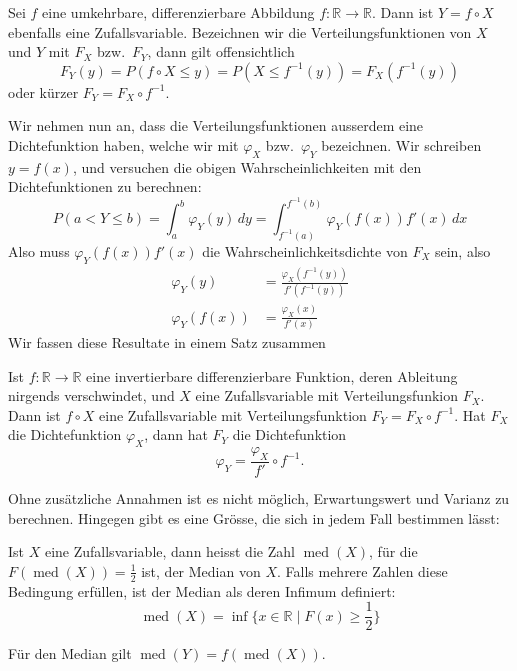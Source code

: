 Sei $f$ eine umkehrbare, differenzierbare Abbildung
$f\colon\mathbb{R}\to\mathbb{R}$.
Dann ist $Y=f\circ X$ ebenfalls eine
Zufallsvariable.
Bezeichnen wir die Verteilungsfunktionen von $X$ und $Y$
mit $F_X$ bzw.~$F_Y$, dann gilt offensichtlich
\[
F_Y(y)=P(f\circ X\le y)=P(X\le f^{-1}(y))=F_X(f^{-1}(y))
\]
oder kürzer $F_Y=F_X\circ f^{-1}$.

Wir nehmen nun an, dass die Verteilungsfunktionen ausserdem eine
Dichtefunktion haben, welche wir mit $\varphi_X$ bzw.~$\varphi_Y$
bezeichnen.
Wir schreiben $y=f(x)$, und versuchen die obigen
Wahrscheinlichkeiten mit den Dichtefunktionen zu berechnen:
\[
P(a<Y\le b)
=\int_a^b\varphi_Y(y)\,dy
=\int_{f^{-1}(a)}^{f^{-1}(b)}\varphi_Y(f(x)) f'(x)\,dx
\]
Also muss $\varphi_Y(f(x))f'(x)$ die Wahrscheinlichkeitsdichte von
$F_X$ sein, also 
\begin{align*}
\varphi_Y(y)&=\frac{\varphi_X(f^{-1}(y))}{f'(f^{-1}(y))}\\
\varphi_Y(f(x))&=\frac{\varphi_X(x)}{f'(x)}
\end{align*}
Wir fassen diese Resultate in einem Satz zusammen

\begin{satz}
\label{satz-variablentransformation}
Ist $f\colon\mathbb{R}\to\mathbb{R}$ eine invertierbare
differenzierbare Funktion, deren Ableitung nirgends verschwindet,
und $X$ eine Zufallsvariable mit Verteilungsfunkion $F_X$.
Dann ist
$f\circ X$ eine Zufallsvariable mit Verteilungsfunktion
$F_Y=F_X\circ f^{-1}$.
Hat $F_X$ die Dichtefunktion $\varphi_X$, dann
hat $F_Y$ die Dichtefunktion
\[
\varphi_Y=\frac{\varphi_X}{f'}\circ f^{-1}.
\]
\end{satz}

Ohne zusätzliche Annahmen ist es nicht möglich, Erwartungswert und
Varianz zu berechnen.
Hingegen gibt es eine Grösse, die sich in jedem
Fall bestimmen lässt:
\begin{definition}
Ist $X$ eine Zufallsvariable, dann heisst die Zahl $\operatorname{med}(X)$,
für die
$F(\operatorname{med}(X))=\frac12$ ist, der Median von $X$. 
Falls mehrere Zahlen diese Bedingung erfüllen, ist der Median als
deren Infimum definiert:
\[
\operatorname{med}(X)=\inf \{x\in\mathbb{R}\;|\;F(x)\ge{\textstyle \frac12}\}
\]
\end{definition}
Für den Median gilt $\operatorname{med}(Y)=f(\operatorname{med}(X))$.

